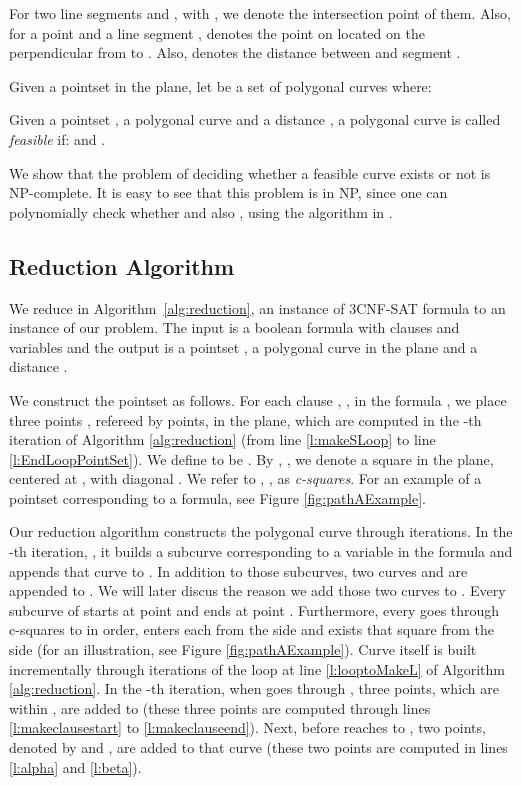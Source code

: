 \documentclass[a4paper,UKenglish]{lipics}
\begin{document}
For two line segments  and , with ,
we denote the intersection point of them. 
Also, 
for a point  and a line segment ,
 denotes the point on  located 
on the perpendicular from  to . Also, 
 denotes the distance 
between  and segment .

\begin{definition} \label{def:feasible}
Given a pointset  in the plane, let 
be a set of polygonal curves  where: 
 

\end{definition}

\begin{definition} \label{def:feasibleNPC}
Given a pointset , a polygonal curve  and a distance , 
a polygonal curve  is called {\em feasible} if: 
 and .
\end{definition}

We show that the problem of deciding whether a 
feasible curve exists or not  is NP-complete.
It is easy to see that this problem is in NP, since 
one can polynomially check whether 
and also , using the algorithm in \cite{AltG95}.


\subsection{Reduction Algorithm}

We reduce in Algorithm~\ref{alg:reduction},
an instance of 3CNF-SAT formula  
to an instance of our problem.
The input is a boolean formula 
 with  clauses  and  variables  
and the output is a pointset ,
a polygonal curve  in the plane and 
a distance .

We construct the pointset  as follows.
For each clause , , in the formula , 
we place three points , refereed by  points, 
in the plane, which are computed
in the -th iteration of Algorithm \ref{alg:reduction} (from line \ref{l:makeSLoop} to line \ref{l:EndLoopPointSet}).
We define  to be .
By , , we denote
a square in the plane, centered at , 
with diagonal . 
We refer to , , as
{\em c-squares}. 
For an example of a pointset  corresponding to a formula, 
see Figure \ref{fig:pathAExample}.


Our reduction algorithm constructs the polygonal curve  
through  iterations. In  the -th iteration, ,
it builds a subcurve  corresponding to  a variable 
 in the formula  and appends that curve to .
In addition to those  subcurves, two curves 
 and  are appended to . 
We will later discus the reason we add those 
two curves to . 
Every subcurve   of  starts at point  
and ends at point .
Furthermore, every   goes through c-squares
 to  in order, enters each   from
the side   and exists that square from 
the side   (for an illustration, see Figure \ref{fig:pathAExample}). 
Curve  itself is built incrementally  
through iterations of the loop at line \ref{l:looptoMakeL} 
of Algorithm \ref{alg:reduction}. 
In the -th iteration, when  goes through ,
three points, which are within  , are added to   
(these three points are computed through lines 
\ref{l:makeclausestart} to \ref{l:makeclauseend}).
Next, before  reaches to ,
two points,  denoted by  and , are added to that curve 
(these two points are computed in lines \ref{l:alpha} 
and \ref{l:beta}).
\end{document}
